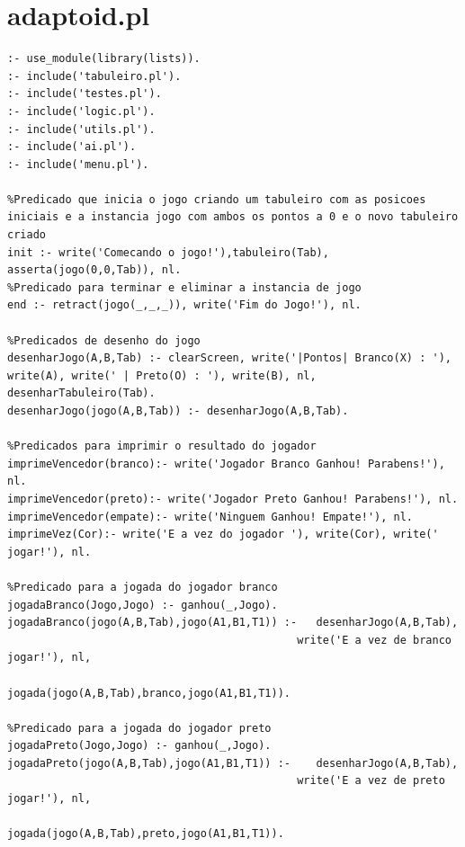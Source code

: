 \documentclass[a4paper]{article}
\begin{document}
\section{adaptoid.pl}
\begin{lstlisting}
:- use_module(library(lists)).
:- include('tabuleiro.pl').
:- include('testes.pl').
:- include('logic.pl').
:- include('utils.pl').
:- include('ai.pl').
:- include('menu.pl').

%Predicado que inicia o jogo criando um tabuleiro com as posicoes iniciais e a instancia jogo com ambos os pontos a 0 e o novo tabuleiro criado
init :- write('Comecando o jogo!'),tabuleiro(Tab), asserta(jogo(0,0,Tab)), nl.
%Predicado para terminar e eliminar a instancia de jogo
end :- retract(jogo(_,_,_)), write('Fim do Jogo!'), nl.

%Predicados de desenho do jogo
desenharJogo(A,B,Tab) :- clearScreen, write('|Pontos| Branco(X) : '), write(A), write(' | Preto(O) : '), write(B), nl, desenharTabuleiro(Tab).
desenharJogo(jogo(A,B,Tab)) :- desenharJogo(A,B,Tab).

%Predicados para imprimir o resultado do jogador
imprimeVencedor(branco):- write('Jogador Branco Ganhou! Parabens!'), nl.
imprimeVencedor(preto):- write('Jogador Preto Ganhou! Parabens!'), nl.
imprimeVencedor(empate):- write('Ninguem Ganhou! Empate!'), nl.
imprimeVez(Cor):- write('E a vez do jogador '), write(Cor), write(' jogar!'), nl.

%Predicado para a jogada do jogador branco
jogadaBranco(Jogo,Jogo) :- ganhou(_,Jogo).
jogadaBranco(jogo(A,B,Tab),jogo(A1,B1,T1)) :-   desenharJogo(A,B,Tab),
                                             write('E a vez de branco jogar!'), nl,
                                             jogada(jogo(A,B,Tab),branco,jogo(A1,B1,T1)).

%Predicado para a jogada do jogador preto
jogadaPreto(Jogo,Jogo) :- ganhou(_,Jogo).
jogadaPreto(jogo(A,B,Tab),jogo(A1,B1,T1)) :-    desenharJogo(A,B,Tab),
                                             write('E a vez de preto jogar!'), nl,
                                             jogada(jogo(A,B,Tab),preto,jogo(A1,B1,T1)).


\end{lstlisting}
\end{document}
